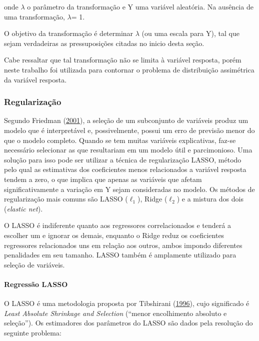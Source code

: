 \documentclass[
	12pt,				%
	a4paper,		%
	oneside,    %
	chapter=TITLE,		   %
	section=TITLE,		   %
	subsection=TITLE,	   %
	subsubsection=TITLE, %
	english,			%
	french,				%
	spanish,			%
	brazil,				%
]{abntex2}
\begin{document}
\noindent onde \(\lambda\) o parâmetro da transformação e Y uma variável
aleatória. Na ausência de uma transformação, \(\lambda\)= 1.

O objetivo da transformação é determinar \(\lambda\) (ou uma escala para
Y), tal que sejam verdadeiras as pressuposições citadas no inicio desta
seção.

Cabe ressaltar que tal transformação não se limita à variável resposta,
porém neste trabalho foi utilizada para contornar o problema de
distribuição assimétrica da variável resposta.

\hypertarget{regularizauxe7uxe3o}{%
\subsubsection{Regularização}\label{regularizauxe7uxe3o}}

Segundo Friedman (\protect\hyperlink{ref-friedman2001elements}{2001}), a
seleção de um subconjunto de variáveis produz um modelo que é
interpretável e, possivelmente, possui um erro de previsão menor do que
o modelo completo. Quando se tem muitas variáveis explicativas, faz-se
necessário selecionar as que resultariam em um modelo útil e
parcimonioso. Uma solução para isso pode ser utilizar a técnica de
regularização LASSO, método pelo qual as estimativas dos coeficientes
menos relacionados a variável resposta tendem a zero, o que implica que
apenas as variáveis que afetam significativamente a variação em Y sejam
consideradas no modelo. Os métodos de regularização mais comuns são
LASSO (\(\ell_1\)), Ridge (\(\ell_2\)) e a mistura dos dois
(\emph{elastic net}).

O LASSO é indiferente quanto aos regressores correlacionados e tenderá a
escolher um e ignorar os demais, enquanto o Ridge reduz os coeficientes
regressores relacionados uns em relação aos outros, ambos impondo
diferentes penalidades em seu tamanho. LASSO também é amplamente
utilizado para seleção de variáveis.

\hypertarget{regressuxe3o-lasso}{%
\paragraph{Regressão LASSO}\label{regressuxe3o-lasso}}

O LASSO é uma metodologia proposta por Tibshirani
(\protect\hyperlink{ref-tibshirani1996regression}{1996}), cujo
significado é \emph{Least Absolute Shrinkage and Selection} (``menor
encolhimento absoluto e seleção''). Os estimadores dos parâmetros do
LASSO são dados pela resolução do seguinte problema:
\end{document}
